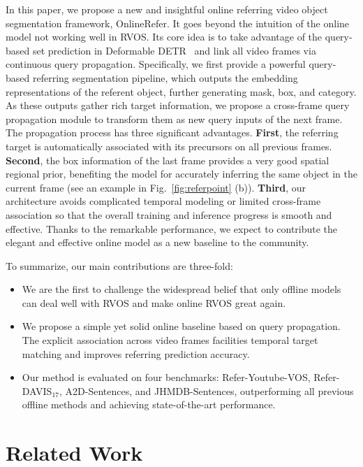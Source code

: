 \documentclass[10pt,twocolumn,letterpaper]{article}
\begin{document}
In this paper, we propose a new and insightful online referring video object segmentation framework, OnlineRefer.
It goes beyond the intuition of the online model not working well in RVOS.
Its core idea is to take advantage of the query-based set prediction in Deformable DETR~\cite{deformable} and 
link all video frames via continuous query propagation.
Specifically, we first provide a powerful query-based referring segmentation pipeline, which outputs the embedding representations of the referent object, further generating mask, box, and category.
As these outputs gather rich target information, we propose a cross-frame query propagation module to transform them as new query inputs of the next frame.
The propagation process has three significant advantages. 
\textbf{First}, the referring target is automatically associated with its precursors on all previous frames.
\textbf{Second}, the box information of the last frame provides a very good spatial regional prior, benefiting the model for accurately inferring the same object in the current frame (see an example in Fig.~\ref{fig:referpoint} (b)).
\textbf{Third}, our architecture avoids complicated temporal modeling or limited cross-frame association so that the overall training and inference progress is smooth and effective.
Thanks to the remarkable performance, we expect to contribute the elegant and effective online model as a new baseline to the community.

To summarize, our main contributions are three-fold:
\begin{itemize}
  \item We are the first to challenge the widespread belief that only offline models can deal well with RVOS and make online RVOS great again.
  \item We propose a simple yet solid online baseline based on query propagation. The explicit association across video frames facilities temporal target matching and improves referring prediction accuracy.
\item Our method is evaluated on four benchmarks: Refer-Youtube-VOS, Refer-DAVIS$_{17}$, A2D-Sentences,  and JHMDB-Sentences, outperforming all previous offline methods and achieving state-of-the-art performance. 
\end{itemize}





\section{Related Work}
\end{document}
